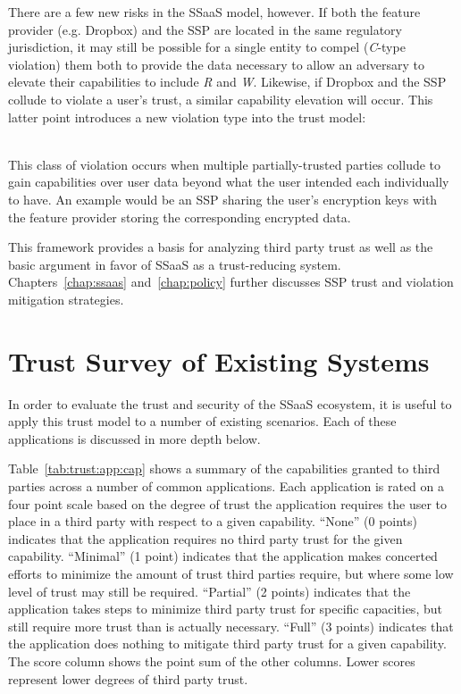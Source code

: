 There are a few new risks in the SSaaS model, however. If both the
feature provider (e.g. Dropbox) and the SSP are located in the same
regulatory jurisdiction, it may still be possible for a single entity
to compel (\emph{C}-type violation) them both to provide the data
necessary to allow an adversary to elevate their capabilities to
include \emph{R} and \emph{W}. Likewise, if Dropbox and the SSP
collude to violate a user's trust, a similar capability elevation will
occur. This latter point introduces a new violation type into the
trust model:

\begin{packed_desc}
\item[Colluding (L):] \hfill \\ This class of violation occurs when
  multiple partially-trusted parties collude to gain capabilities over
  user data beyond what the user intended each individually to
  have. An example would be an SSP sharing the user's encryption keys
  with the feature provider storing the corresponding encrypted data.
\end{packed_desc}

This framework provides a basis for analyzing third party trust as
well as the basic argument in favor of SSaaS as a trust-reducing
system. Chapters~\ref{chap:ssaas} and~\ref{chap:policy} further
discusses SSP trust and violation mitigation strategies.

\section{Trust Survey of Existing Systems}
\label{chap:trust:survey}

In order to evaluate the trust and security of the SSaaS ecosystem,
it is useful to apply this trust model to a number of existing
scenarios. Each of these applications is discussed in more depth
below.

Table~\ref{tab:trust:app:cap} shows a summary of the capabilities
granted to third parties across a number of common applications. Each
application is rated on a four point scale based on the degree of
trust the application requires the user to place in a third party with
respect to a given capability. ``None'' (0 points) indicates that the
application requires no third party trust for the given
capability. ``Minimal'' (1 point) indicates that the application makes
concerted efforts to minimize the amount of trust third parties
require, but where some low level of trust may still be
required. ``Partial'' (2 points) indicates that the application takes
steps to minimize third party trust for specific capacities, but still
require more trust than is actually necessary. ``Full'' (3 points)
indicates that the application does nothing to mitigate third party
trust for a given capability. The score column shows the point sum of
the other columns. Lower scores represent lower degrees of third party
trust.

